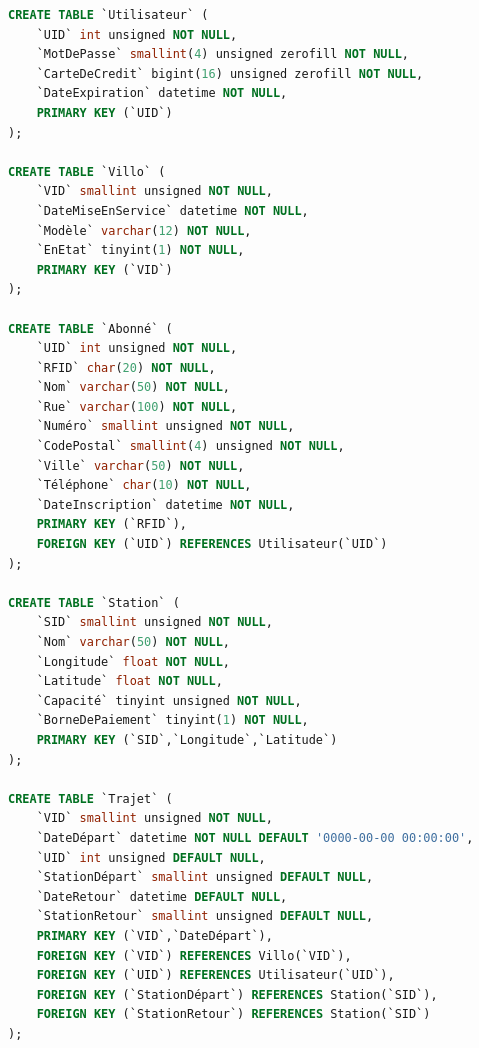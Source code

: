 \documentclass[a4paper, 12pt]{report}
\begin{document}
\begin{lstlisting}[language=sql]
CREATE TABLE `Utilisateur` (
	`UID` int unsigned NOT NULL,
	`MotDePasse` smallint(4) unsigned zerofill NOT NULL,
	`CarteDeCredit` bigint(16) unsigned zerofill NOT NULL,
	`DateExpiration` datetime NOT NULL,
	PRIMARY KEY (`UID`)
);

CREATE TABLE `Villo` (
	`VID` smallint unsigned NOT NULL,
	`DateMiseEnService` datetime NOT NULL,
	`Modèle` varchar(12) NOT NULL,
	`EnEtat` tinyint(1) NOT NULL,
	PRIMARY KEY (`VID`)
);

CREATE TABLE `Abonné` (
	`UID` int unsigned NOT NULL,
	`RFID` char(20) NOT NULL,
	`Nom` varchar(50) NOT NULL,
	`Rue` varchar(100) NOT NULL,
	`Numéro` smallint unsigned NOT NULL,
	`CodePostal` smallint(4) unsigned NOT NULL,
	`Ville` varchar(50) NOT NULL,
	`Téléphone` char(10) NOT NULL,
	`DateInscription` datetime NOT NULL,
	PRIMARY KEY (`RFID`),
	FOREIGN KEY (`UID`) REFERENCES Utilisateur(`UID`)
);

CREATE TABLE `Station` (
	`SID` smallint unsigned NOT NULL,
	`Nom` varchar(50) NOT NULL,
	`Longitude` float NOT NULL,
	`Latitude` float NOT NULL,
	`Capacité` tinyint unsigned NOT NULL,
	`BorneDePaiement` tinyint(1) NOT NULL,
	PRIMARY KEY (`SID`,`Longitude`,`Latitude`)
);

CREATE TABLE `Trajet` (
	`VID` smallint unsigned NOT NULL,
	`DateDépart` datetime NOT NULL DEFAULT '0000-00-00 00:00:00',
	`UID` int unsigned DEFAULT NULL,
	`StationDépart` smallint unsigned DEFAULT NULL,
	`DateRetour` datetime DEFAULT NULL,
	`StationRetour` smallint unsigned DEFAULT NULL,
	PRIMARY KEY (`VID`,`DateDépart`),
	FOREIGN KEY (`VID`) REFERENCES Villo(`VID`),
	FOREIGN KEY (`UID`) REFERENCES Utilisateur(`UID`),
	FOREIGN KEY (`StationDépart`) REFERENCES Station(`SID`),
	FOREIGN KEY (`StationRetour`) REFERENCES Station(`SID`)
);
\end{lstlisting}
\end{document}
